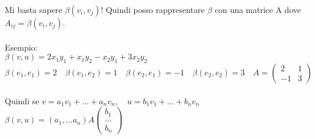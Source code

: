\documentclass[12pt]{article}
\begin{document}
Mi basta sapere $\beta(v_i,v_j)$! Quindi posso rappresentare $\beta$ con una matrice A dove $A_{ij} = \beta(v_i, v_j)$.\\\\
Esempio:\\
$\beta(v,u) = 2x_1y_1+x_1y_2-x_2y_1+3x_2y_2$\\
$\beta(e_1,e_1) = 2 \quad \beta(e_1,e_2) = 1 \quad \beta(e_2,e_1) = -1 \quad \beta(e_2,e_2) = 3\quad A = \begin{pmatrix}
    2 & 1 \\
    -1 & 3
\end{pmatrix}$\\\\
Quindi se $v = a_1v_1+...+a_nv_n, \quad u = b_1v_1+...+b_nv_n$\\
$\beta(v,u) = (a_1,...a_n)A\begin{pmatrix}
    b_1\\
    ...\\
    b_n
\end{pmatrix}$
\end{document}
